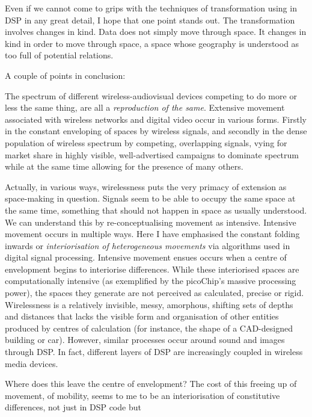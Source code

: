 Even if we cannot come to grips with the techniques of transformation
using in DSP in any great detail, I hope that one point stands out. The
transformation involves {\quote changes in
kind}. Data does not simply move through space. It
changes in kind in order to move through space, a space whose geography
is understood as too full of potential relations.


A couple of points in conclusion:

\startitemize[a]
\item The spectrum of different wireless{}-audiovisual devices competing
to do more or less the same thing, are all a {\em reproduction of
the same}. Extensive movement associated with wireless networks and
digital video occur in various forms. Firstly in the constant
enveloping of spaces by wireless signals, and secondly in the dense
population of wireless spectrum by competing, overlapping signals,
vying for market share in highly visible, well{}-advertised campaigns
to dominate spectrum while at the same time allowing for the presence
of many others. 
\item Actually, in various ways, wirelessness puts the very primacy of
extension as space{}-making in question. Signals seem to be able to
occupy the same space at the same time, something that should not
happen in space as usually understood. We can understand this by
re{}-conceptualising movement as intensive. Intensive movement occurs
in multiple ways. Here I have emphasised the constant folding inwards
or {\em interiorisation of heterogeneous movements} via
algorithms used in digital signal processing. Intensive movement ensues
occurs when a centre of envelopment begins to interiorise differences.
While these interiorised spaces are computationally intensive (as
exemplified by the picoChip's massive processing
power), the spaces they generate are not perceived as calculated,
precise or rigid. Wirelessness is a relatively invisible, messy,
amorphous, shifting sets of depths and distances that lacks the visible
form and organisation of other entities produced by centres of
calculation (for instance, the shape of a CAD{}-designed building or
car). However, similar processes occur around sound and images through
DSP. In fact, different layers of DSP are increasingly coupled in
wireless media devices.
\item Where does this leave the centre of envelopment? The cost of this
freeing up of movement, of mobility, seems to me to be an
interiorisation of constitutive differences, not just in DSP code but
